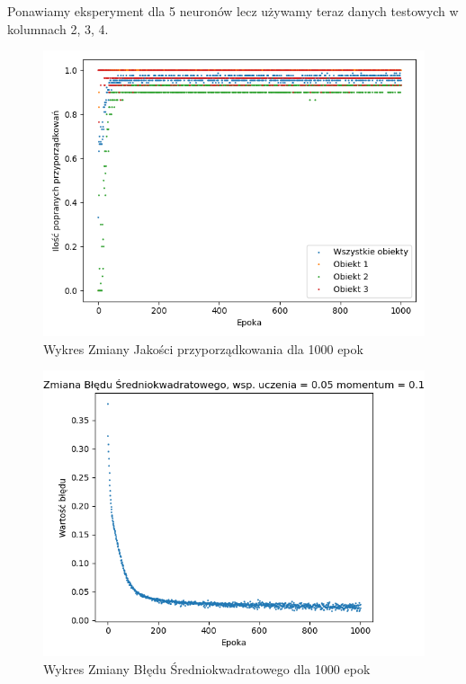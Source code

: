 \documentclass[12pt]{article}
\begin{document}
Ponawiamy eksperyment dla 5 neuronów lecz używamy teraz danych testowych w kolumnach 2, 3, 4.

\begin{figure}[!ht]
 \centering
 \includegraphics[width=12cm]{WykresPrzyporzadkowania5neuron3wejscia2.png}
 \caption{Wykres Zmiany Jakości przyporządkowania dla 1000 epok}
 \vspace{-0.1cm}
 \label{WykresPrzyp6}
\end{figure}

\newpage

\begin{figure}[!ht]
 \centering
 \includegraphics[width=12cm]{WykresBlad5neuron3wejscia2.png}
 \caption{Wykres Zmiany Błędu Średniokwadratowego dla 1000 epok}
 \vspace{-0.1cm}
 \label{WykresBlad6}
\end{figure}
\end{document}
